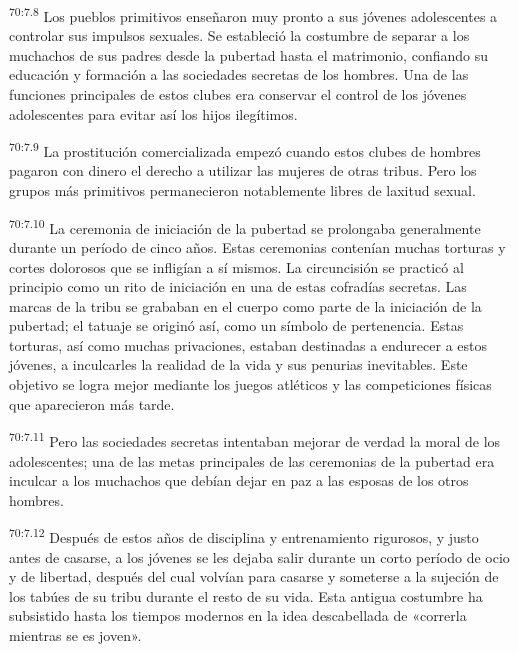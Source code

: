 \par
\textsuperscript{70:7.8} Los pueblos primitivos enseñaron muy pronto a sus jóvenes adolescentes a controlar sus impulsos sexuales. Se estableció la costumbre de separar a los muchachos de sus padres desde la pubertad hasta el matrimonio, confiando su educación y formación a las sociedades secretas de los hombres. Una de las funciones principales de estos clubes era conservar el control de los jóvenes adolescentes para evitar así los hijos ilegítimos.

\par
\textsuperscript{70:7.9} La prostitución comercializada empezó cuando estos clubes de hombres pagaron con dinero el derecho a utilizar las mujeres de otras tribus. Pero los grupos más primitivos permanecieron notablemente libres de laxitud sexual.

\par
\textsuperscript{70:7.10} La ceremonia de iniciación de la pubertad se prolongaba generalmente durante un período de cinco años. Estas ceremonias contenían muchas torturas y cortes dolorosos que se infligían a sí mismos. La circuncisión se practicó al principio como un rito de iniciación en una de estas cofradías secretas. Las marcas de la tribu se grababan en el cuerpo como parte de la iniciación de la pubertad; el tatuaje se originó así, como un símbolo de pertenencia. Estas torturas, así como muchas privaciones, estaban destinadas a endurecer a estos jóvenes, a inculcarles la realidad de la vida y sus penurias inevitables. Este objetivo se logra mejor mediante los juegos atléticos y las competiciones físicas que aparecieron más tarde.

\par
\textsuperscript{70:7.11} Pero las sociedades secretas intentaban mejorar de verdad la moral de los adolescentes; una de las metas principales de las ceremonias de la pubertad era inculcar a los muchachos que debían dejar en paz a las esposas de los otros hombres.

\par
\textsuperscript{70:7.12} Después de estos años de disciplina y entrenamiento rigurosos, y justo antes de casarse, a los jóvenes se les dejaba salir durante un corto período de ocio y de libertad, después del cual volvían para casarse y someterse a la sujeción de los tabúes de su tribu durante el resto de su vida. Esta antigua costumbre ha subsistido hasta los tiempos modernos en la idea descabellada de «correrla mientras se es joven».

